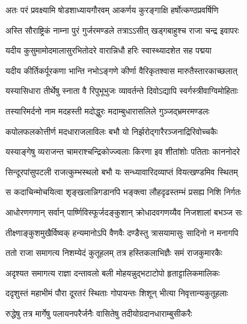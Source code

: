 \genMangalaShloka

\closesub

\ganapatyadiDhyanam
\padmaPuranam



\twolineshloka
{अतः परं प्रवक्ष्यामि षोडशाध्यायगौरवम्}
{आकर्णय कुरङ्गाक्षि हर्षोत्कण्ठप्रवर्षिणि} %

\twolineshloka
{अस्ति सौराष्ट्रिकं नाम्ना पुरं गुर्जरमण्डले}
{तत्राऽऽसीत् खड्गबाहुश्च राजा चन्द्र इवापरः} %

\twolineshloka
{यदीय कुसुमामोदमालासुरभितोदरे}
{वारान्निधौ हरिः स्वास्थ्यादशेत सह पद्मया} %

\twolineshloka
{यदीय कीर्तिकर्पूरकणा भान्ति नभोऽङ्गणे}
{कीर्णा वैरिकृतश्वास मारुतैस्तारकाच्छलात्} %

\twolineshloka
{यस्यासिधारा तीर्थेषु स्नाता वै रिपुभूभुजः}
{व्यावर्तन्ते दिवोऽद्यापि स्वर्गस्त्रीवाग्विमोहिताः} %

\twolineshloka
{तस्यारिमर्दनो नाम मदहस्ती मदोद्धुरः}
{मदाम्बुधारासलिले गुञ्जद्भ्रमरमण्डलः} %

\twolineshloka
{कपोलफलकोत्तीर्ण मदधाराजलाविलः}
{बभौ यो निर्झरोद्गारैरञ्जनाद्रिरिवोच्चकैः} %

\twolineshloka
{यस्याङ्गेषु व्यराजन्त चामराश्चन्द्रिकोज्ज्वलाः}
{किरणा इव शीतांशोः पतिताः काननोदरे} %

\twolineshloka
{सिन्दूरपांसुपटली राजत्कुम्भस्थलो बभौ}
{यः सन्ध्यावारिदव्याप्तं वियत्खण्डमिव स्थितम्} %

\twolineshloka
{स कदाचिन्मोचयित्वा शृङ्खलान्निगडानपि}
{भङ्क्त्वा लौहदृढस्तम्भं प्रसह्य निशि निर्गतः} %

\twolineshloka
{आधोरणगणान् सर्वान् पार्ष्णिविस्फूर्जदङ्कुशान्}
{क्रोधादवगणय्यैव निजशालां बभञ्ज सः} %

\twolineshloka
{तीक्ष्णाङ्कुशमुखैर्विष्वक् हन्यमानोऽपि वैणवैः}
{दण्डैस्तु त्रासयामासुः सादिनो न मनागपि} %

\twolineshloka
{ततो राजा समागत्य निशम्येदं कुतूहलम्}
{तत्र हस्तिकलाभिज्ञैः समं राजकुमारकैः} %

\twolineshloka
{अदृश्यत समागत्य राज्ञा दन्तावलो बली}
{मोहयन्नुद्भटाटोपो हृताट्टालिकमालिकः} %

\twolineshloka
{ददृशुस्तं महाभीमं पौरा दूरतरं स्थिताः}
{गोपायन्तः शिशून् भीत्या निवृत्तान्यकुतूहलाः} %

\twolineshloka
{रुद्धेषु तत्र मार्गेषु पलायनपरैर्जनैः}
{वासितेषु तदीयोग्रदानधाराम्बुसीकरैः} %

